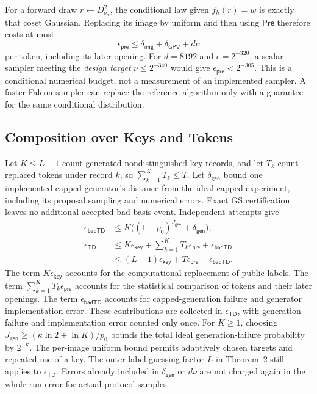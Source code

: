 \documentclass[lettersize,journal]{IEEEtran}
\begin{document}
	For a forward draw $r\leftarrow D_{\sigma_r}^{2}$, the conditional
	law given $f_h(r)=w$ is exactly that coset Gaussian. Replacing its
	image by uniform and then using $\mathsf{Pre}$ therefore costs at most
	\[
	\epsilon_{\mathsf{pre}}
	\leq\delta_{\mathsf{img}}+\delta_{\mathsf{GPV}}+d\nu
	\]
	per token, including its later opening. For $d=8192$ and
	$\epsilon=2^{-320}$, a scalar sampler meeting the \emph{design target}
	$\nu\leq2^{-340}$ would give $\epsilon_{\mathsf{pre}}<2^{-305}$.
	This is a conditional numerical budget, not a measurement of an
	implemented sampler. A faster Falcon sampler can replace the reference
	algorithm only with a guarantee for the same conditional distribution.
	
	\subsection{Composition over Keys and Tokens}
	Let $K\leq L-1$ count generated nondistinguished key records, and let
	$T_k$ count replaced tokens under record $k$, so $\sum_{k=1}^KT_k\leq T$.
	Let $\delta_{\mathsf{gen}}$ bound one implemented capped generator's
	distance from the ideal capped experiment, including its proposal
	sampling and numerical errors. Exact GS certification leaves no
	additional accepted-bad-basis event. Independent attempts give
	\[
	\begin{aligned}
		\epsilon_{\mathsf{badTD}}
		&\leq K\bigl((1-p_0)^{J_{\mathsf{gen}}}
		+\delta_{\mathsf{gen}}\bigr),\\
		\epsilon_{\mathsf{TD}}
		&\leq K\epsilon_{\mathsf{key}}
		+\sum_{k=1}^K T_k\epsilon_{\mathsf{pre}}
		+\epsilon_{\mathsf{badTD}}\\
		&\leq (L-1)\epsilon_{\mathsf{key}}
		+T\epsilon_{\mathsf{pre}}+\epsilon_{\mathsf{badTD}}.
	\end{aligned}
	\]
	The term $K\epsilon_{\mathsf{key}}$ accounts for the computational
	replacement of public labels.
	The term $\sum_{k=1}^{K}T_k\epsilon_{\mathsf{pre}}$ accounts for the
	statistical comparison of tokens and their later openings.
	The term $\epsilon_{\mathsf{badTD}}$ accounts for capped-generation
	failure and generator implementation error.
	These contributions are collected in $\epsilon_{\mathsf{TD}}$,
	with generation failure and implementation error counted only once. For $K\geq1$, choosing
	$J_{\mathsf{gen}}\geq(\kappa\ln2+\ln K)/p_0$ bounds the total ideal
	generation-failure probability by $2^{-\kappa}$. The per-image uniform
	bound permits adaptively chosen targets and repeated use of a key.
	The outer label-guessing factor $L$ in Theorem~2 still applies to
	$\epsilon_{\mathsf{TD}}$. Errors already included in
	$\delta_{\mathsf{gen}}$ or $d\nu$ are not charged again in the
	whole-run error for actual protocol samples.
	
\end{document}
